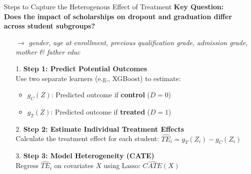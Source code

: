 \documentclass[aspectratio=169]{beamer}
\begin{document}
\begin{frame}{Steps to Capture the Heterogenous Effect of Treatment}
\textbf{Key Question:} \\
\textbf{Does the impact of scholarships on dropout and graduation differ across student subgroups?}
\vspace{-4pt}
\begin{itemize}
	\item [$\rightarrow$]  \textit{gender, age at enrollment, previous qualification grade, admission grade, mother \& father educ}
\end{itemize}

\begin{itemize}
    \item[1.] \textbf{Step 1: Predict Potential Outcomes} \\
    Use two separate learners (e.g., XGBoost) to estimate:
    \begin{itemize}
        \item $g_C(Z)$: Predicted outcome if \textbf{control} ($D=0$)
        \item $g_T(Z)$: Predicted outcome if \textbf{treated} ($D=1$)
    \end{itemize}

    \item[2.] \textbf{Step 2: Estimate Individual Treatment Effects} \\
    Calculate the treatment effect for each student:
    $\widehat{TE}_i = g_T(Z_i) - g_C(Z_i)$

    \item[3.] \textbf{Step 3: Model Heterogeneity (CATE)} \\
    Regress $\widehat{TE}_i$ on covariates $X$ using Lasso: $\widehat{CATE}(X)$
\end{itemize}

    
\end{frame}
\end{document}
